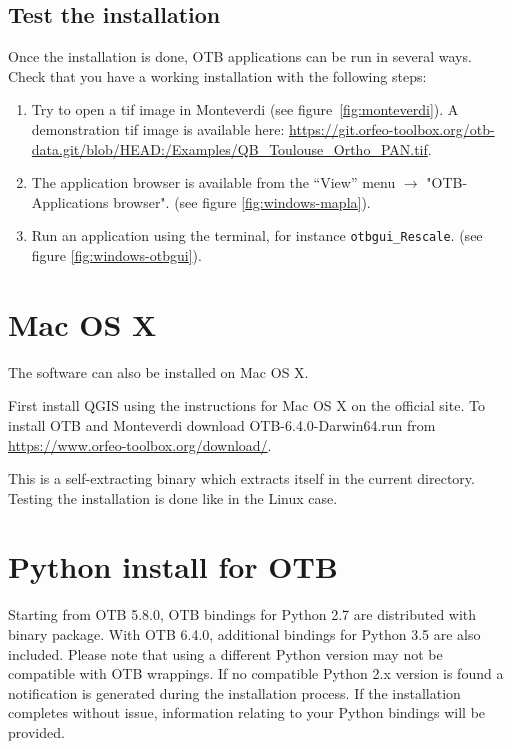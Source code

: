 \documentclass[10pt,a4paper]{article}
\begin{document}
\subsection{Test the installation}
Once the installation is done, OTB applications can be run in several ways. Check that you have a working installation with the following steps:
\begin{enumerate}

\item Try to open a tif image in Monteverdi (see
figure~\ref{fig:monteverdi}). A demonstration tif image is available here: \url{https://git.orfeo-toolbox.org/otb-data.git/blob/HEAD:/Examples/QB\_Toulouse\_Ortho\_PAN.tif}.

\item The application browser is available from the ``View'' menu 
$\rightarrow$ "OTB-Applications browser".
(see figure \ref{fig:windows-mapla}).

\item Run an application using the terminal, for instance
\texttt{otbgui\_Rescale}. (see figure \ref{fig:windows-otbgui}).

\end{enumerate}

\clearpage
\section{Mac OS X}

The software can also be installed on Mac OS X.

First install QGIS using the instructions for Mac OS X on the official site. To install OTB and  Monteverdi download 
OTB-6.4.0-Darwin64.run from \url{https://www.orfeo-toolbox.org/download/}.

This is a self-extracting binary which extracts itself in the current directory. Testing the installation is done like in the Linux case.


\clearpage
\section{Python install for OTB}

Starting from OTB 5.8.0, OTB bindings for Python 2.7 are distributed with binary package. With OTB 6.4.0, additional bindings for Python 3.5 are also included. Please note that using a different Python version may not be compatible with OTB wrappings. If no compatible Python 2.x version is found a notification is generated during the installation process. If the installation completes without issue, information relating to your Python bindings will be provided.
\end{document}
